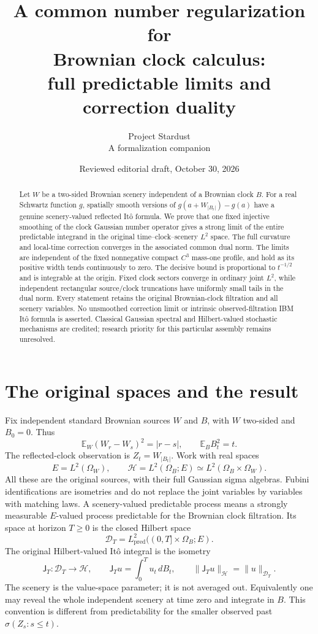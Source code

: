 \documentclass[11pt]{article}
\title{A common number regularization for\protect\\Brownian clock calculus:\protect\\full predictable limits and correction duality}
\author{Project Stardust\\\small A formalization companion}
\date{Reviewed editorial draft, October 30, 2026}
\newcommand{\E}{\mathbb E}
\newcommand{\HH}{\mathcal H}
\newcommand{\DD}{\mathcal D}
\newcommand{\J}{\mathsf J}
\begin{document}
\maketitle
\begin{abstract}
Let $W$ be a two-sided Brownian scenery independent of a Brownian clock $B$.
For a real Schwartz function $g$, spatially smooth versions of
$g(a+W_{|B_t|})-g(a)$ have a genuine scenery-valued reflected It\^o formula.
We prove that one fixed injective smoothing of the clock Gaussian number
operator gives a strong limit of the entire predictable integrand in the
original time--clock--scenery $L^2$ space. The full curvature and local-time
correction converges in the associated common dual norm. The limits are
independent of the fixed nonnegative compact $C^3$ mass-one profile, and
hold as its positive width tends continuously to zero. The decisive bound
is proportional to $t^{-1/2}$ and is integrable at the origin. Fixed clock
sectors converge in ordinary joint $L^2$, while independent rectangular
source/clock truncations have uniformly small tails in the dual norm.
Every statement retains the original Brownian-clock filtration and all
scenery variables. No unsmoothed correction limit or intrinsic
observed-filtration IBM It\^o formula is asserted. Classical Gaussian
spectral and Hilbert-valued stochastic mechanisms are credited; research
priority for this particular assembly remains unresolved.
\end{abstract}

\section{The original spaces and the result}
Fix independent standard Brownian sources $W$ and $B$, with
$W$ two-sided and $B_0=0$. Thus
\[
 \E_W(W_r-W_s)^2=|r-s|,\qquad \E_B B_t^2=t.
\]
The reflected-clock observation is $Z_t=W_{|B_t|}$. Work with real spaces
\[
 E=L^2(\Omega_W),\qquad
 \HH=L^2(\Omega_B;E)\simeq L^2(\Omega_B\times\Omega_W).
\]
All these are the original sources, with their full Gaussian sigma
algebras. Fubini identifications are isometries and do not replace the
joint variables by variables with matching laws. A scenery-valued
predictable process means a strongly measurable $E$-valued process
predictable for the Brownian clock filtration. Its space at horizon
$T\geq0$ is the closed Hilbert space
\[
 \DD_T=L^2_{\mathrm{pred}}((0,T]\times\Omega_B;E).
\]
The original Hilbert-valued It\^o integral is the isometry
\begin{equation}\label{eq:ito}
 \J_T:\DD_T\longrightarrow\HH,\qquad
 \J_Tu=\int_0^T u_t\,dB_t,\qquad \|\J_Tu\|_{\HH}=\|u\|_{\DD_T}.
\end{equation}
The scenery is the value-space parameter; it is not averaged out.
Equivalently one may reveal the whole independent scenery at time zero
and integrate in $B$. This convention is different from predictability
for the smaller observed past $\sigma(Z_s:s\leq t)$.
\end{document}
